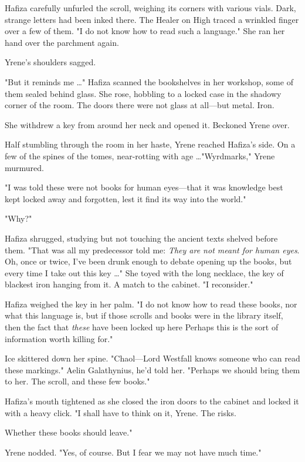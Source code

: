 Hafiza carefully unfurled the scroll, weighing its corners with various vials. Dark, strange letters had been inked there. The Healer on High traced a wrinkled finger over a few of them. "I do not know how to read such a language." She ran her hand over the parchment again.

Yrene's shoulders sagged.

"But it reminds me \ldots" Hafiza scanned the bookshelves in her workshop, some of them sealed behind glass. She rose, hobbling to a locked case in the shadowy corner of the room. The doors there were not glass at all---but metal. Iron.

She withdrew a key from around her neck and opened it. Beckoned Yrene over.

Half stumbling through the room in her haste, Yrene reached Hafiza's side. On a few of the spines of the tomes, near-rotting with age
\ldots"Wyrdmarks," Yrene murmured.

"I was told these were not books for human eyes---that it was knowledge best kept locked away and forgotten, lest it find its way into the world."

"Why?"

Hafiza shrugged, studying but not touching the ancient texts shelved before them. "That was all my predecessor told me: \emph{They are not meant for human eyes}. Oh, once or twice, I've been drunk enough to debate opening up the books, but every time I take out this key \ldots" She toyed with the long necklace, the key of blackest iron hanging from it. A match to the cabinet. "I reconsider."

Hafiza weighed the key in her palm. "I do not know how to read these books, nor what this language is, but if those scrolls and books were in the library itself, then the fact that \emph{these} have been locked up here  Perhaps this is the sort of information worth killing for."

Ice skittered down her spine. "Chaol---Lord Westfall knows someone who can read these markings." Aelin Galathynius, he'd told her. "Perhaps we should bring them to her. The scroll, and these few books."

Hafiza's mouth tightened as she closed the iron doors to the cabinet and locked it with a heavy click. "I shall have to think on it, Yrene. The risks.

Whether these books should leave."

Yrene nodded. "Yes, of course. But I fear we may not have much time."

